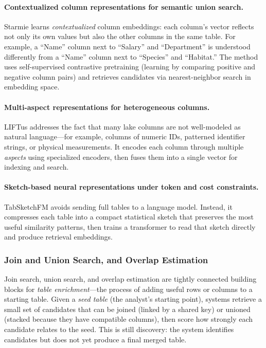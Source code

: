 \documentclass[sigconf]{acmart}
\begin{document}
\paragraph{Contextualized column representations for semantic union search.}
Starmie learns \emph{contextualized} column embeddings: each column's vector reflects not only its own values but also the other columns in the same table. For example, a ``Name'' column next to ``Salary'' and ``Department'' is understood differently from a ``Name'' column next to ``Species'' and ``Habitat.'' The method uses self-supervised contrastive pretraining (learning by comparing positive and negative column pairs) and retrieves candidates via nearest-neighbor search in embedding space.

\paragraph{Multi-aspect representations for heterogeneous columns.}
LIFTus addresses the fact that many lake columns are not well-modeled as natural language---for example, columns of numeric IDs, patterned identifier strings, or physical measurements. It encodes each column through multiple \emph{aspects} using specialized encoders, then fuses them into a single vector for indexing and search.

\paragraph{Sketch-based neural representations under token and cost constraints.}
TabSketchFM avoids sending full tables to a language model. Instead, it compresses each table into a compact statistical sketch that preserves the most useful similarity patterns, then trains a transformer to read that sketch directly and produce retrieval embeddings.

\subsubsection{Join and Union Search, and Overlap Estimation}
Join search, union search, and overlap estimation are tightly connected building blocks for \emph{table enrichment}---the process of adding useful rows or columns to a starting table. Given a \emph{seed table} (the analyst's starting point), systems retrieve a small set of candidates that can be joined (linked by a shared key) or unioned (stacked because they have compatible columns), then score how strongly each candidate relates to the seed. This is still discovery: the system identifies candidates but does not yet produce a final merged table.
\end{document}
